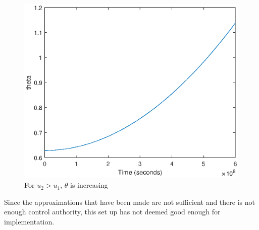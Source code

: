 %
\begin{figure}[H]
	\centering
	\includegraphics[width=0.6\linewidth]
	{figures/nontheta.eps}
	\caption{For $u_2 >u_1$, $\theta$ is increasing }
	\label{fig:intheta}
\end{figure}
%
 Since the approximations that have been made are not sufficient and there is not enough control authority, this set up has not deemed good enough for implementation. 
%
